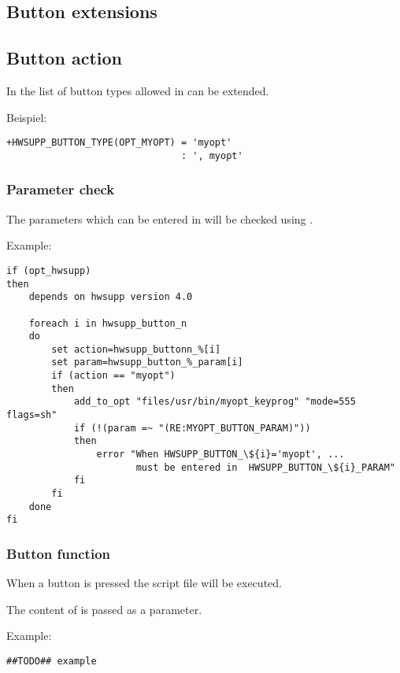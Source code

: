 \subsection{Button extensions}
\subsection{Button action}
  In  the list of button types allowed in 
  can be extended.

Beispiel:
\begin{verbatim}
+HWSUPP_BUTTON_TYPE(OPT_MYOPT) = 'myopt' 
                               : ', myopt'
\end{verbatim}

\subsubsection{Parameter check}
  The parameters which can be entered in 
  will be checked using  .

Example:
\begin{verbatim}
if (opt_hwsupp)
then
    depends on hwsupp version 4.0

    foreach i in hwsupp_button_n
    do
        set action=hwsupp_buttonn_%[i]
        set param=hwsupp_button_%_param[i]
        if (action == "myopt")
        then
            add_to_opt "files/usr/bin/myopt_keyprog" "mode=555 flags=sh"
            if (!(param =~ "(RE:MYOPT_BUTTON_PARAM)"))
            then
                error "When HWSUPP_BUTTON_\${i}='myopt', ...
                       must be entered in  HWSUPP_BUTTON_\${i}_PARAM" 
            fi
        fi
    done
fi
\end{verbatim}

\subsubsection {Button function}
  When a button is pressed the script file 
  will be executed.
 
  The content of  is passed as a parameter.

Example:
\begin{verbatim}
##TODO## example
\end{verbatim}

